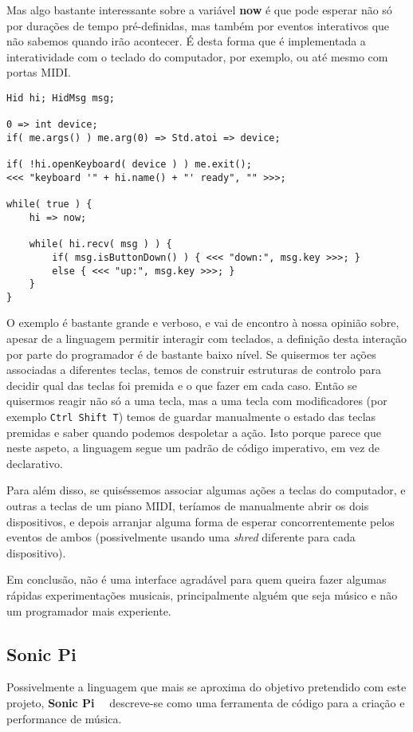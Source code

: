 Mas algo bastante interessante sobre a variável \textbf{now} é que pode esperar não só por durações de tempo pré-definidas, mas também por eventos interativos que não sabemos quando irão acontecer. É desta forma que é implementada a interatividade com o teclado do computador, por exemplo, ou até mesmo com portas MIDI.

\begin{lstlisting}[caption={Exemplos de instruções de avanço no tempo},label={lst:chuck-5}]
Hid hi; HidMsg msg;

0 => int device;
if( me.args() ) me.arg(0) => Std.atoi => device;

if( !hi.openKeyboard( device ) ) me.exit();
<<< "keyboard '" + hi.name() + "' ready", "" >>>;

while( true ) {
    hi => now;

    while( hi.recv( msg ) ) {
        if( msg.isButtonDown() ) { <<< "down:", msg.key >>>; } 
        else { <<< "up:", msg.key >>>; }
    }
}
\end{lstlisting}

O exemplo é bastante grande e verboso, e vai de encontro à nossa opinião sobre, apesar de a linguagem permitir interagir com teclados, a definição desta interação por parte do programador é de bastante baixo nível. Se quisermos ter ações associadas a diferentes teclas, temos de construir estruturas de controlo para decidir qual das teclas foi premida e o que fazer em cada caso. Então se quisermos reagir não só a uma tecla, mas a uma tecla com modificadores (por exemplo \texttt{Ctrl Shift T}) temos de guardar manualmente o estado das teclas premidas e saber quando podemos despoletar a ação. Isto porque parece que neste aspeto, a linguagem segue um padrão de código imperativo, em vez de declarativo.

Para além disso, se quiséssemos associar algumas ações a teclas do computador, e outras a teclas de um piano MIDI, teríamos de manualmente abrir os dois dispositivos, e depois arranjar alguma forma de esperar concorrentemente pelos eventos de ambos (possivelmente usando uma \textit{shred} diferente para cada dispositivo).

Em conclusão, não é uma interface agradável para quem queira fazer algumas rápidas experimentações musicais, principalmente alguém que seja músico e não um programador mais experiente.

\subsection{Sonic Pi}
Possivelmente a linguagem que mais se aproxima do objetivo pretendido com este projeto, \textbf{Sonic Pi}~\citep{doi:SonicPi}~\citep{sonic-pi} descreve-se como uma ferramenta de código para a criação e performance de música.

